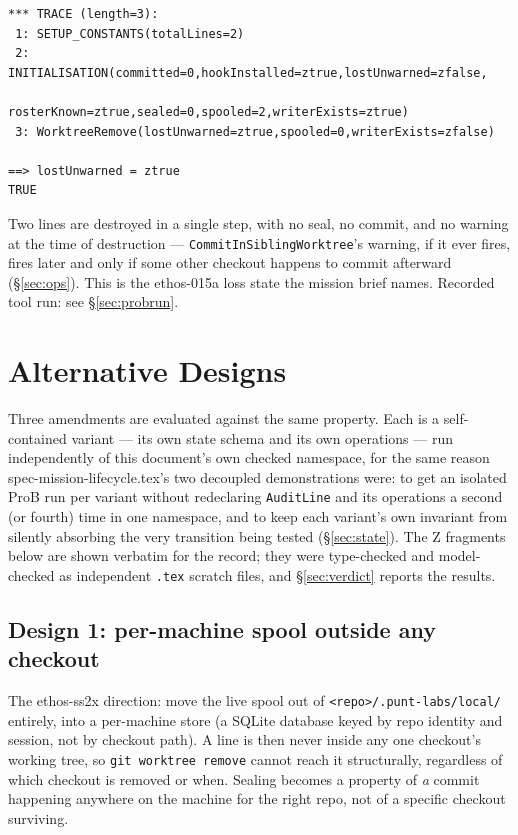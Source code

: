 \documentclass[a4paper,10pt,fleqn]{article}
\newcommand{\fpath}[1]{\nolinkurl{#1}}
\newcommand{\field}[1]{\ifmmode\texttt{#1}\else\texorpdfstring{\breakfield{#1}}{#1}\fi}
\begin{document}
\begin{verbatim}
*** TRACE (length=3):
 1: SETUP_CONSTANTS(totalLines=2)
 2: INITIALISATION(committed=0,hookInstalled=ztrue,lostUnwarned=zfalse,
                    rosterKnown=ztrue,sealed=0,spooled=2,writerExists=ztrue)
 3: WorktreeRemove(lostUnwarned=ztrue,spooled=0,writerExists=zfalse)

==> lostUnwarned = ztrue
TRUE
\end{verbatim}

Two lines are destroyed in a single step, with no seal, no commit, and no
warning at the time of destruction --- \field{CommitInSiblingWorktree}'s
warning, if it ever fires, fires later and only if some other checkout
happens to commit afterward (\S\ref{sec:ops}). This is the ethos-015a loss
state the mission brief names. Recorded tool run: see
\S\ref{sec:probrun}.

\section{Alternative Designs}
\label{sec:alternatives}

Three amendments are evaluated against the same property. Each is a
self-contained variant --- its own state schema and its own operations ---
run independently of this document's own checked namespace, for the same
reason spec-mission-lifecycle.tex's two decoupled demonstrations were: to
get an isolated ProB run per variant without redeclaring \field{AuditLine}
and its operations a second (or fourth) time in one namespace, and to keep
each variant's own invariant from silently absorbing the very transition
being tested (\S\ref{sec:state}). The Z fragments below are shown verbatim
for the record; they were type-checked and model-checked as independent
\fpath{.tex} scratch files, and \S\ref{sec:verdict} reports the results.

\subsection{Design 1: per-machine spool outside any checkout}
\label{sec:design1}

The ethos-ss2x direction: move the live spool out of
\fpath{<repo>/.punt-labs/local/} entirely, into a per-machine store (a
SQLite database keyed by repo identity and session, not by checkout path).
A line is then never inside any one checkout's working tree, so
\fpath{git worktree remove} cannot reach it structurally, regardless of
which checkout is removed or when. Sealing becomes a property of
\emph{a} commit happening anywhere on the machine for the right repo, not
of a specific checkout surviving.
\end{document}
